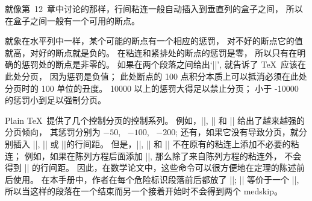 \smallskip\noindent
就像第~12~章中讨论的那样，行间粘连一般自动插入到垂直列的盒子之间，
所以在盒子之间一般有一个可用的断点。

\danger 就象在水平列中一样，某个可能的断点有一个相应的惩罚，
对不好的断点它的值就高，对好的断点就是负的。%
在粘连和紧排处的断点的惩罚是零，
所以只有在明确的惩罚处的断点是非零的。%
如果在两个段落之间给出`||', 就告诉了 \TeX\ 应该在此处分页，
因为惩罚是负值；
此处断点的 100 点积分本质上可以抵消必须在此处分页时的 100 单位的丑度。%
10000 以上的惩罚大得足以禁止分页；
小于 -10000 的惩罚小到足以强制分页。

\danger \1Plain \TeX\ 提供了几个控制分页的控制系列。%
例如，|\smallbreak|, |\medbreak| 和 |\bigbreak| 给出了越来越强的分页倾向，
其惩罚分别为 $-50$, ~$-100$, ~$-200$;
还有，如果它没有导致分页，就分别插入 |\smallskip|, |\medskip| 或 |\bigskip|的行间距。%
但是，|\smallbreak|, |\medbreak| 和 |\bigbreak| 不在原有的粘连上添加不必要的粘连；
例如，如果在陈列方程后面添加 |\samllbreak|, 那么除了来自陈列方程的粘连外，
不会得到 |\smallskip| 的行间距。%
因此，在数学论文中，这些命令可以很方便地在定理的陈述前后使用。%
在本手册中，作者在每个危险标识段落前后都放了 |\medbreak|;
|\medbreak\medbreak| 等价于一个 |\medbreak|,
所以当这样的段落在一个结束而另一个接着开始时不会得到两个 medskip。

